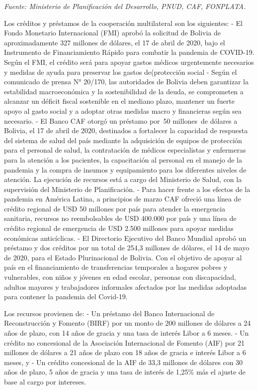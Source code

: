 \documentclass[a4paper, nobind]{templates/ociamthesis}
\begin{document}
\emph{Fuente: Ministerio de Planificación del Desarrollo, PNUD, CAF, FONPLATA.}

Los créditos y préstamos de la cooperación multilateral son los siguientes:
- El Fondo Monetario Internacional (FMI) aprobó la solicitud de Bolivia de aproximadamente 327 millones de dólares, el 17 de abril de 2020, bajo el Instrumento de Financiamiento Rápido para combatir la pandemia de COVID-19. Según el FMI, el crédito será para apoyar gastos médicos urgentemente necesarios y medidas de ayuda para preservar los gastos de(protección social
- Según el comunicado de prensa N° 20/170, las autoridades de Bolivia deben garantizar la estabilidad macroeconómica y la sostenibilidad de la deuda, se comprometen a alcanzar un déficit fiscal sostenible en el mediano plazo, mantener un fuerte apoyo al gasto social y a adoptar otras medidas macro y financieras según sea necesario.
- El Banco CAF otorgó un préstamo por~50 millones~de dólares a Bolivia, el 17 de abril de 2020, destinados a fortalecer la capacidad de respuesta del sistema de salud del país mediante la adquisición de equipos de protección para el personal de salud, la contratación de médicos especialistas y enfermeras para la atención a los pacientes, la capacitación al personal en el manejo de la pandemia y la compra de insumos y equipamiento para los diferentes niveles de atención. La ejecución de recursos está a cargo del Ministerio de Salud, con la supervisión del Ministerio de Planificación.
- Para hacer frente a los efectos de la pandemia en América Latina, a principios de marzo CAF ofreció una línea de crédito regional de USD 50 millones por país para atender la emergencia sanitaria, recursos no reembolsables de USD 400.000 por país y una línea de crédito regional de emergencia de USD 2.500 millones para apoyar medidas económicas anticíclicas.
- El Directorio Ejecutivo del Banco Mundial aprobó un préstamo y dos créditos por un total de 254,3 millones de dólares, el 14 de mayo de 2020, para el Estado Plurinacional de Bolivia. Con el objetivo de apoyar al país en el financiamiento de transferencias temporales a hogares pobres y vulnerables, con niños y jóvenes en edad escolar, personas con discapacidad, adultos mayores y trabajadores informales afectados por las medidas adoptadas para contener la pandemia del Covid-19.

Los recursos provienen de:
- Un préstamo del Banco Internacional de Reconstrucción y Fomento (BIRF) por un monto de 200 millones de dólares a 24 años de plazo, con 14 años de gracia y una tasa de interés Libor a 6 meses.
- Un crédito no concesional de la Asociación Internacional de Fomento (AIF) por 21 millones de dólares a 21 años de plazo con 18 años de gracia e interés Libor a 6 meses, y
- Un crédito concesional de la AIF de 33,3 millones de dólares con 30 años de plazo, 5 años de gracia y una tasa de interés de 1,25\% más el ajuste de base al cargo por intereses.
\end{document}
